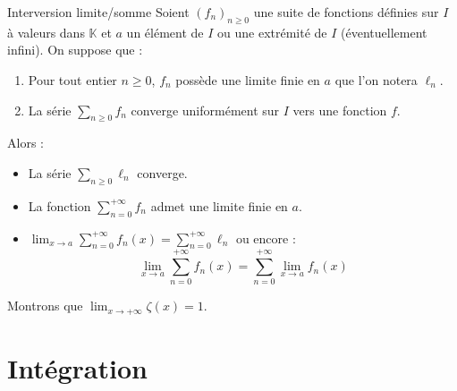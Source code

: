 \documentclass[a4paper,10pt]{report}
\begin{document}
\begin{Theoreme}{Interversion limite/somme}
Soient $(f_n)_{n \geq 0}$ une suite de fonctions définies sur $I$ à valeurs dans $\mathbb{K}$ et $a$ un élément de $I$ ou une extrémité de $I$ (éventuellement infini). On suppose que :

\begin{enumerate}
\item Pour tout entier $n \geq 0$, $f_n$ possède une limite finie en $a$ que l'on notera $\ell_n$.
\item La série $ \sum_{ n \geq 0} f_n$ converge uniformément sur $I$ vers une fonction $f$.
\end{enumerate}
Alors :

\begin{itemize}
\item La série $ \sum_{n \geq 0} \ell_n$ converge.
\item La fonction $\sum_{n=0}^{+ \infty} f_n $ admet une limite finie en $a$.
\item $\lim_{x \rightarrow a} \sum_{n=0}^{+ \infty} f_n(x) = \sum_{n=0}^{+ \infty} \ell_n$ ou encore :
$$  \lim_{x \rightarrow a} \sum_{n=0}^{+ \infty} f_n(x) = \sum_{n=0}^{+ \infty} \lim_{x \rightarrow a} f_n(x)$$
\end{itemize}
\end{Theoreme}

\begin{Exemple} Montrons que $\lim_{x \rightarrow + \infty} \zeta(x) = 1$.

%

\vspace{8cm}
\end{Exemple}

\section{Intégration}
\end{document}
